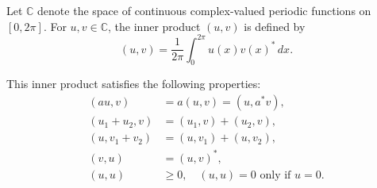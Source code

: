 Let $\mathbb{C}$ denote the space of continuous complex-valued periodic functions on $[0, 2\pi]$. For $u, v \in \mathbb{C}$, the inner product $(u, v)$ is defined by
$$
(u, v) = \frac{1}{2\pi} \int_{0}^{2\pi} u(x) v(x)^* \, dx.
$$

This inner product satisfies the following properties:
\begin{align}
(au, v) &= a(u, v) = (u, a^*v), \\
(u_1 + u_2, v) &= (u_1, v) + (u_2, v), \\
(u, v_1 + v_2) &= (u, v_1) + (u, v_2), \\
(v, u) &= (u, v)^*, \\
(u, u) &\geq 0, \quad (u, u) = 0 \text{ only if } u = 0.
\end{align}

